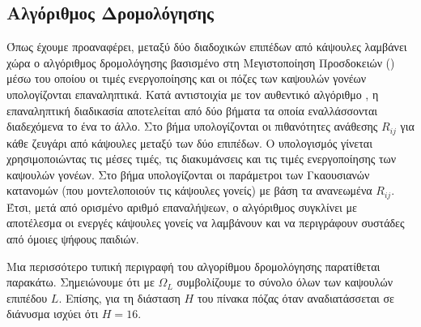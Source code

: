 \subsection{Αλγόριθμος Δρομολόγησης }

Όπως έχουμε προαναφέρει, μεταξύ δύο διαδοχικών επιπέδων από κάψουλες λαμβάνει χώρα ο αλγόριθμος δρομολόγησης βασισμένο στη Μεγιστοποίηση Προσδοκειών () μέσω του οποίου οι τιμές ενεργοποίησης και οι πόζες των καψουλών γονέων υπολογίζονται επαναληπτικά. Κατά αντιστοιχία με τον αυθεντικό αλγόριθμο , η επαναληπτική διαδικασία αποτελείται από δύο βήματα τα οποία εναλλάσσονται διαδεχόμενα το ένα το άλλο. Στο βήμα  υπολογίζονται οι πιθανότητες ανάθεσης $R_{ij}$ για κάθε ζευγάρι από κάψουλες μεταξύ των δύο επιπέδων. Ο υπολογισμός γίνεται χρησιμοποιώντας τις μέσες τιμές, τις διακυμάνσεις και τις τιμές ενεργοποίησης των καψουλών γονέων. Στο βήμα  υπολογίζονται οι παράμετροι των Γκαουσιανών κατανομών (που μοντελοποιούν τις κάψουλες γονείς) με βάση τα ανανεωμένα $R_{ij}$. Έτσι, μετά από ορισμένο αριθμό επαναλήψεων, ο αλγόριθμος συγκλίνει με αποτέλεσμα οι ενεργές κάψουλες γονείς να λαμβάνουν και να περιγράφουν συστάδες από όμοιες ψήφους παιδιών. \par

Μια περισσότερο τυπική περιγραφή του αλγορίθμου δρομολόγησης παρατίθεται παρακάτω. Σημειώνουμε ότι με $\Omega_L$ συμβολίζουμε το σύνολο όλων των καψουλών επιπέδου $L$. Επίσης, για τη διάσταση $H$ του πίνακα πόζας όταν αναδιατάσσεται σε διάνυσμα ισχύει ότι $Η = 16$.


